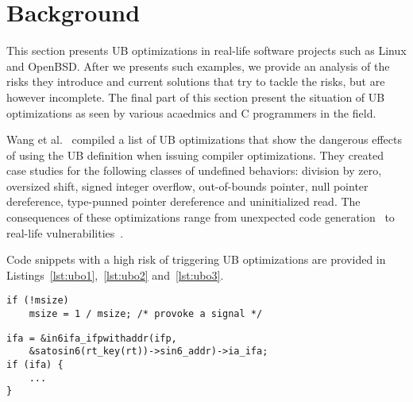 \section{Background} \label{sec:bg}

This section presents UB optimizations in real-life software projects
such as Linux and OpenBSD. After we presents such examples, we provide
an analysis of the risks they introduce and current solutions that try
to tackle the risks, but are however incomplete. The final part of this
section present the situation of UB optimizations as seen by various
acaedmics and C programmers in the field.

Wang et al.~\cite{wang2012undefined} compiled a list of UB optimizations
that show the dangerous effects of using the UB definition when issuing
compiler optimizations. They created case studies for the following
classes of undefined behaviors: division by zero, oversized shift,
signed integer overflow, out-of-bounds pointer, null pointer
dereference, type-punned pointer dereference and uninitialized read. The
consequences of these optimizations range from unexpected code
generation~\cite{chen2014,fermatub} to real-life
vulnerabilities~\cite{mitreub}.

Code snippets with a high risk of triggering UB optimizations are
provided in Listings~\ref{lst:ubo1},~\ref{lst:ubo2} and~\ref{lst:ubo3}.

\begin{lstlisting}[style=Cstyle, caption=Compiler assumes that dividing
a number by zero makes no sense and the whole block is deleted
(lib/mpi/mpi-pow.c in the Linux kernel), label={lst:ubo1}]
if (!msize)
	msize = 1 / msize; /* provoke a signal */
\end{lstlisting}

\begin{lstlisting}[style=Cstyle, caption={Compiler assumes that
in6ifa\_ifpwithaddr returns NULL then makes ipa6 NULL and deletes the if
check (sys/netinet6/nd6.c in the OpenBSD kernel)}, label={lst:ubo2}]
ifa = &in6ifa_ifpwithaddr(ifp,
	&satosin6(rt_key(rt))->sin6_addr)->ia_ifa;
if (ifa) {
	...
}
\end{lstlisting}

